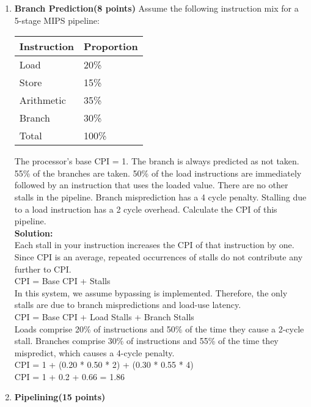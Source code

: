 \documentclass[a4paper,10pt]{article}
\begin{document}
\begin{enumerate}

\item \textbf{Branch Prediction(8 points)}
Assume the following instruction mix for a 5-stage MIPS pipeline:
\begin{center}
  \begin{table}[h]
  \centering
\begin{tabular}{ |l|l|}
\hline
Instruction &	Proportion \\ \hline
Load & 20\% \\ \hline
Store & 15\%  \\ \hline 
Arithmetic	& 35\%  \\ \hline
Branch & 30\%  \\\hline
Total & 100\% \\\hline
\end{tabular}
\end{table}
\end{center}
The processor’s base CPI = 1. The branch is always predicted as not taken.  55\% of the branches are taken.  50\% of the load instructions are immediately followed by an instruction that uses the loaded value. There are no other stalls in the pipeline.  Branch misprediction has a 4 cycle penalty. Stalling due to a load instruction has a 2 cycle overhead. Calculate the CPI of this pipeline.\\

\textbf{Solution:}\\
Each stall in your instruction increases the CPI of that instruction by one. Since CPI is an  average, repeated occurrences of stalls do not contribute any further to CPI.\\ 
CPI = Base CPI + Stalls \\
In this system, we assume bypassing is implemented. Therefore, the only stalls are due to branch mispredictions and load-use latency. \\
CPI = Base CPI + Load Stalls + Branch Stalls \\
Loads comprise 20\% of instructions and 50\% of the time they cause a 2-cycle stall. Branches  comprise 30\% of instructions and 55\% of the time they mispredict, which causes a 4-cycle  penalty. \\
CPI = 1 + (0.20 * 0.50 * 2) + (0.30 * 0.55 * 4) \\
CPI = 1 + 0.2 + 0.66 = 1.86

\item \textbf{Pipelining(15 points)} 


\end{enumerate}
\end{document}
